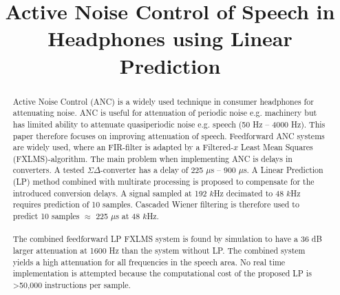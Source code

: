 \documentclass[conference]{IEEEtran}
\begin{document}
\title{Active Noise Control of Speech in Headphones using Linear Prediction}

\author{
}

\maketitle

\begin{abstract}
Active Noise Control (ANC) is a widely used technique in consumer headphones for attenuating noise. ANC is useful for attenuation of periodic noise e.g. machinery but has limited ability to attenuate quasiperiodic noise e.g. speech (50 Hz -- 4000 Hz). This paper therefore focuses on improving attenuation of speech. Feedforward ANC systems are widely used, where an FIR-filter is adapted by a Filtered-$x$ Least Mean Squares (FXLMS)-algorithm. The main problem when implementing ANC is delays in converters. A tested $\Sigma\Delta$-converter has a delay of 225 $\mu$s -- 900 $\mu$s. A Linear Prediction (LP) method combined with multirate processing is proposed to compensate for the introduced conversion delays. A signal sampled at 192 $k$Hz decimated to 48 $k$Hz requires prediction of 10 samples.   Cascaded Wiener filtering is therefore used to predict 10 samples $\approx$ 225 $\mu$s at 48 $k$Hz. 
\\\\
The combined feedforward LP FXLMS system is found by simulation to have a 36 dB larger attenuation at 1600 Hz than the system without LP. The combined system yields a high attenuation for all frequencies in the speech area. No real time implementation is attempted because the computational cost of the proposed LP is >50,000 instructions per sample. %
	

\end{abstract}
\end{document}
